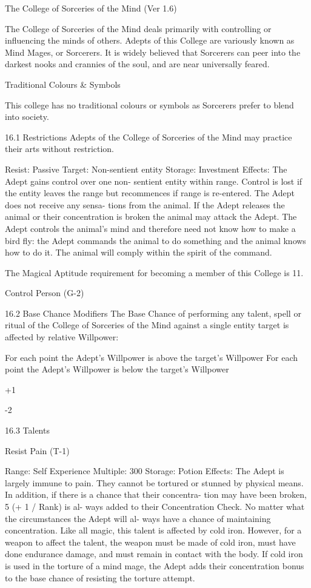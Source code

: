 \begin{Chapter}{The College of Sorceries of the Mind (Ver 1.6)}

The College of Sorceries of the Mind deals primarily with controlling
or influencing the minds of others. Adepts of this College are
variously known as Mind Mages, or Sorcerers. It is widely believed
that Sorcerers can peer into the darkest nooks and crannies of the
soul, and are near universally feared.

Traditional Colours \& Symbols  

This  college  has  no  traditional  colours  or  symbols 
as Sorcerers prefer to blend into society. 

16.1 Restrictions  
Adepts  of  the  College  of  Sorceries  of  the  Mind 
may practice their arts without restriction. 

Resist: Passive 
Target: Non-sentient entity 
Storage: Investment 
Effects:  The  Adept  gains  control  over  one  non-
sentient  entity  within  range.  Control  is  lost  if  the 
entity leaves the range but recommences if range is 
re-entered.  The  Adept  does  not  receive  any  sensa-
tions  from  the  animal.  If  the  Adept  releases  the 
animal  or  their  concentration  is  broken  the  animal 
may  attack  the  Adept.  The  Adept  controls  the 
animal’s mind and therefore need not know how to 
make a bird fly: the Adept commands the animal to 
do  something  and  the  animal  knows  how  to  do  it. 
The  animal  will  comply  within  the  spirit  of  the 
command. 

The Magical Aptitude requirement for becoming a 
member of this College is 11. 

Control Person (G-2) 

16.2 Base Chance Modifiers 
The Base Chance of performing any talent, spell or 
ritual  of  the  College  of  Sorceries  of  the  Mind 
against a single entity target is affected by relative 
Willpower: 

For each point the Adept’s Willpower is 
above the target’s Willpower 
For each point the Adept’s Willpower is 
below the target’s Willpower 

+1 

-2 

16.3 Talents  

Resist Pain (T-1)  

Range: Self 
Experience Multiple: 300 
Storage: Potion 
Effects: The Adept is largely immune to pain. They 
cannot  be  tortured  or  stunned  by  physical  means. 
In addition, if there is a chance that their concentra-
tion  may  have  been  broken,  5  (+  1  /  Rank)  is  al-
ways  added  to  their  Concentration  Check.  No 
matter  what  the  circumstances  the  Adept  will  al-
ways  have  a  chance  of  maintaining  concentration. 
Like all magic, this talent is affected by cold iron. 
However,  for  a  weapon  to  affect  the  talent,  the 
weapon must be made of cold iron, must have done 
endurance  damage,  and  must  remain  in  contact 
with the body. If cold iron is used in the torture of 
a  mind  mage,  the  Adept  adds  their  concentration 
bonus  to  the  base  chance  of  resisting  the  torture 
attempt. 


\end{Chapter}
